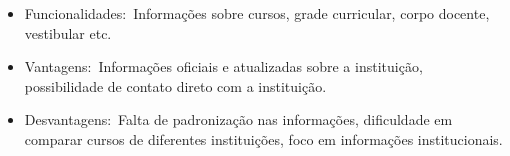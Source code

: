 \documentclass[a4paper]{article}
\begin{document}
\begin{itemize}[series=listWWNumxiii,label=[F0B7?]]
\item Funcionalidades: Informações sobre cursos, grade curricular, corpo docente, vestibular etc.
\item Vantagens: Informações oficiais e atualizadas sobre a instituição, possibilidade de contato direto com a
instituição.
\item Desvantagens: Falta de padronização nas informações, dificuldade em comparar cursos de diferentes instituições,
foco em informações institucionais.
\end{itemize}

\bigskip


\bigskip
\end{document}
